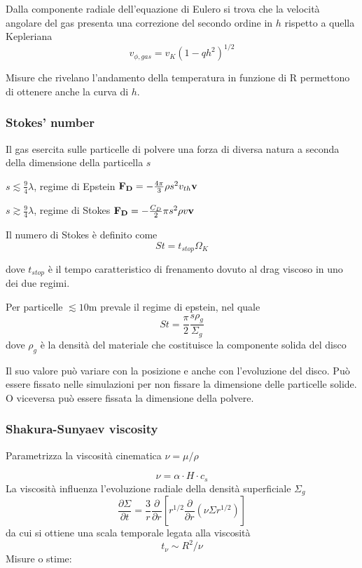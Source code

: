 \documentclass[DIN, pagenumber=false, fontsize=11pt, parskip=half]{scrartcl}
\begin{document}
Dalla componente radiale dell'equazione di Eulero si trova che la velocità angolare del gas presenta una correzione del secondo ordine in $h$ rispetto a quella Kepleriana
\begin{equation}
v_{\phi, gas} = v_K(1-qh^2)^{1/2}
\end{equation}

Misure che rivelano l'andamento della temperatura in funzione di R permettono di ottenere anche la curva di $h$.

\subsubsection{Stokes' number}
\label{stnum}
Il gas esercita sulle particelle di polvere una forza di diversa natura a seconda della dimensione della particella $s$

$s \lesssim \frac94 \lambda$, regime di Epstein $\bold{F_D} = -\frac{4\pi}3 \rho s^2 v_{th} \bold{v}$

$s \gtrsim \frac94 \lambda$, regime di Stokes $\bold{F_D} = -\frac{C_D}2 \pi s^2 \rho v \bold{v}$

Il numero di Stokes è definito come 
\begin{equation}
St = t_{stop}\Omega_K
\end{equation}

dove $t_{stop}$  è il tempo caratteristico di frenamento dovuto al drag viscoso in uno dei due regimi.

Per particelle $\lesssim 10\text{m}$ prevale il regime di epstein, nel quale
\begin{equation}
St = \frac\pi2 \frac{s\rho_g}{\Sigma_g}
\end{equation}
dove $\rho_g$  è la densità del materiale che costituisce la componente solida del disco

Il suo valore può variare con la posizione e anche con l'evoluzione del disco. 
Può essere fissato nelle simulazioni per non fissare la dimensione delle particelle solide. O viceversa può essere fissata la dimensione della polvere.

\subsubsection{Shakura-Sunyaev viscosity}
\label{visc}
Parametrizza la viscosità cinematica $\nu = \mu/\rho$ 

\begin{equation}
\nu = \alpha \cdot H \cdot c_s
\end{equation}
La viscosità influenza l'evoluzione radiale della densità superficiale $\Sigma_g$ 
\begin{equation}
\frac{\partial\Sigma}{\partial t}= \frac{3}{r} \frac{\partial}{\partial r} [r^{1/2}\frac{\partial}{\partial r}(\nu\Sigma r^{1/2})]
\end{equation}
da cui si ottiene una scala temporale legata alla viscosità
\begin{equation}
t_\nu \sim R^2/\nu
\end{equation}
Misure o stime:
\end{document}
